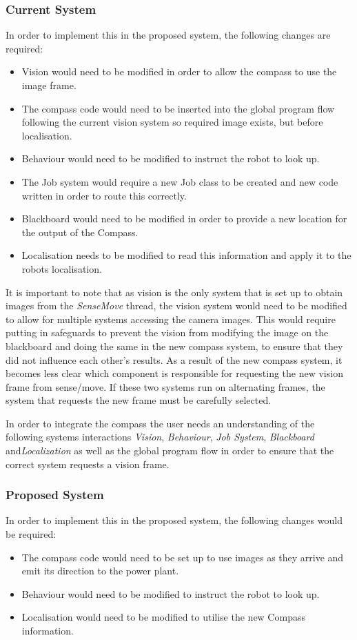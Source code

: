 \documentclass[english,12pt]{scrartcl}
\begin{document}
			\subsubsection{Current System}
				In order to implement this in the proposed system, the following changes are required:

				\begin{itemize}
					\item Vision would need to be modified in order to allow the compass to use the image frame.
					\item The compass code would need to be inserted into the global program flow following the current vision system so required image exists, but before localisation.
					\item Behaviour would need to be modified to instruct the robot to look up.
					\item The Job system would require a new Job class to be created and new code written in order to route this correctly.
					\item Blackboard would need to be modified in order to provide a new location for the output of the Compass.
					\item Localisation needs to be modified to read this information and apply it to the robots localisation.
				\end{itemize}

				It is important to note that as vision is the only system that is set up to obtain images from the \emph{SenseMove} thread, the vision system would need to be modified to allow for multiple systems accessing the camera images.
				This would require putting in safeguards to prevent the vision from modifying the image on the blackboard and doing the same in the new compass system, to ensure that they did not influence each other’s results.
				As a result of the new compass system, it becomes less clear which component is responsible for requesting the new vision frame from sense/move.
				If these two systems run on alternating frames, the system that requests the new frame must be carefully selected.

				In order to integrate the compass the user needs an understanding of the following systems interactions \emph{Vision}, \emph{Behaviour}, \emph{Job System}, \emph{Blackboard} and\emph{Localization} as well as the global program flow in order to ensure that the correct system requests a vision frame.

			\subsubsection{Proposed System}
				In order to implement this in the proposed system, the following changes would be required:
				\begin{itemize}
					\item The compass code would need to be set up to use images as they arrive and emit its direction to the power plant.
					\item Behaviour would need to be modified to instruct the robot to look up.
					\item Localisation would need to be modified to utilise the new Compass information.
				\end{itemize}
\end{document}
